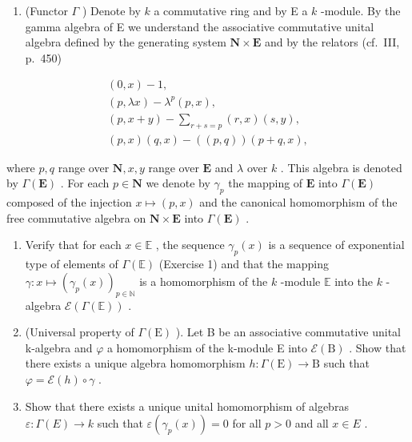 \begin{enumerate}
\def\labelenumi{\arabic{enumi})}
\setcounter{enumi}{1}
\tightlist
\item
  (Functor \(\Gamma\) ) Denote by \(k\) a commutative ring and by E a \(k\) -module. By the gamma algebra of E we understand the associative commutative unital algebra defined by the generating system \(\mathbf{N} \times \mathbf{E}\) and by the relators (cf.~III, p.~450)
\end{enumerate}

\[
\begin{array}{c} (0, x) - 1, \\ (p, \lambda x) - \lambda^ {p} (p, x), \\ (p, x + y) - \sum_ {r + s = p} (r, x) (s, y), \\ (p, x) (q, x) - ((p, q)) (p + q, x), \end{array}
\]

where \(p, q\) range over \(\mathbf{N}, x, y\) range over \(\mathbf{E}\) and \(\lambda\) over \(k\) . This algebra is denoted by \(\Gamma(\mathbf{E})\) . For each \(p \in \mathbf{N}\) we denote by \(\gamma_p\) the mapping of \(\mathbf{E}\) into \(\Gamma(\mathbf{E})\) composed of the injection \(x \mapsto (p, x)\) and the canonical homomorphism of the free commutative algebra on \(\mathbf{N} \times \mathbf{E}\) into \(\Gamma(\mathbf{E})\) .

\begin{enumerate}
\def\labelenumi{\alph{enumi})}
\item
  Verify that for each \(x \in \mathbb{E}\) , the sequence \(\gamma_p(x)\) is a sequence of exponential type of elements of \(\Gamma(\mathbb{E})\) (Exercise 1) and that the mapping \(\gamma : x \mapsto (\gamma_p(x))_{p \in \mathbb{N}}\) is a homomorphism of the \(k\) -module \(\mathbb{E}\) into the \(k\) -algebra \(\mathcal{E}(\Gamma(\mathbb{E}))\) .
\item
  (Universal property of \(\Gamma(\mathrm{E})\) ). Let B be an associative commutative unital k-algebra and \(\varphi\) a homomorphism of the k-module E into \(\mathcal{E}(\mathrm{B})\) . Show that there exists a unique algebra homomorphism \(h: \Gamma(\mathrm{E}) \to \mathrm{B}\) such that \(\varphi = \mathcal{E}(h) \circ \gamma\) .
\item
  Show that there exists a unique unital homomorphism of algebras \(\varepsilon : \Gamma(E) \to k\) such that \(\varepsilon(\gamma_p(x)) = 0\) for all \(p > 0\) and all \(x \in E\) .
\end{enumerate}

